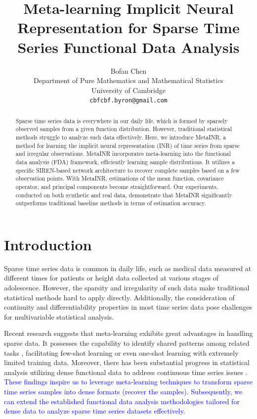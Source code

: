 \documentclass{article}
\title{Meta-learning Implicit Neural Representation for Sparse Time Series Functional Data Analysis}
\author{%
  Bofan Chen\\
  Department of Pure Mathematics and Mathematical Statistics\\
  University of Cambridge\\
  \texttt{cbfcbf.byron@gmail.com} \\}
\begin{document}
\maketitle

\begin{abstract}
  Sparse time series data is everywhere in our daily life, which is formed by sparsely observed samples from a given function distribution. However, traditional statistical methods struggle to analyze such data effectively. 
  Here, we introduce MetaINR, a method for learning the implicit neural representation (INR) of time series from sparse and irregular observations.
  MetaINR incorporates meta-learning into the functional data analysis (FDA) framework, 
  efficiently learning sample distributions. 
  It utilizes a specific SIREN-based network architecture to recover complete samples based on a few observation points. 
  With MetaINR, estimations of the mean function, covariance operator, and principal components become straightforward.
  Our experiments, conducted on both synthetic and real data, demonstrate that MetaINR significantly outperforms traditional baseline methods in terms of estimation accuracy.
\end{abstract}

\section{Introduction}
Sparse time series data is common in daily life, such as medical data measured at different times for patients or height data collected at various stages of adolescence. 
However, the sparsity and irregularity of such data make traditional statistical methods hard to apply directly. 
Additionally, the consideration of continuity and differentiability properties in most time series data pose challenges for multivariable statistical analysis.

Recent research suggests that meta-learning \cite{finn2017model,hospedales2021meta,beck2023survey} exhibits great advantages in handling sparse data. 
It possesses the capability to identify shared patterns among related tasks \cite{raghu2019rapid}, 
facilitating few-shot learning or even one-shot learning \cite{sun2019meta} with extremely limited training data. 
Moreover, there has been substantial progress in statistical analysis utilizing dense functional data to address continuous time series issues \cite{wang2016functional}. 
\textcolor{blue}{These findings inspire us to leverage meta-learning techniques to transform sparse time series samples into dense formats (recover the samples).
Subsequently, we can extend the established functional data analysis methodologies tailored for dense data to analyze sparse time series datasets effectively.
}
\end{document}
